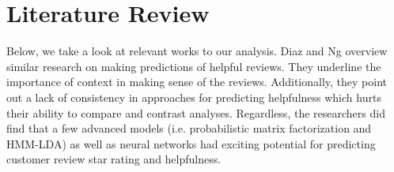 \documentclass[10pt, conference, compsocconf]{IEEEtran}
\begin{document}
\section{Literature Review}




Below, we take a look at relevant works to our analysis. Diaz and Ng \cite{ocampo} overview similar research on making predictions of helpful reviews. They underline the importance of context in making sense of the reviews. Additionally, they point out a lack of consistency in approaches for predicting helpfulness which hurts their ability to compare and contrast analyses. Regardless, the researchers did find that a few advanced models (i.e. probabilistic matrix factorization and HMM-LDA) as well as neural networks had exciting potential for predicting customer review star rating and helpfulness.
\end{document}

